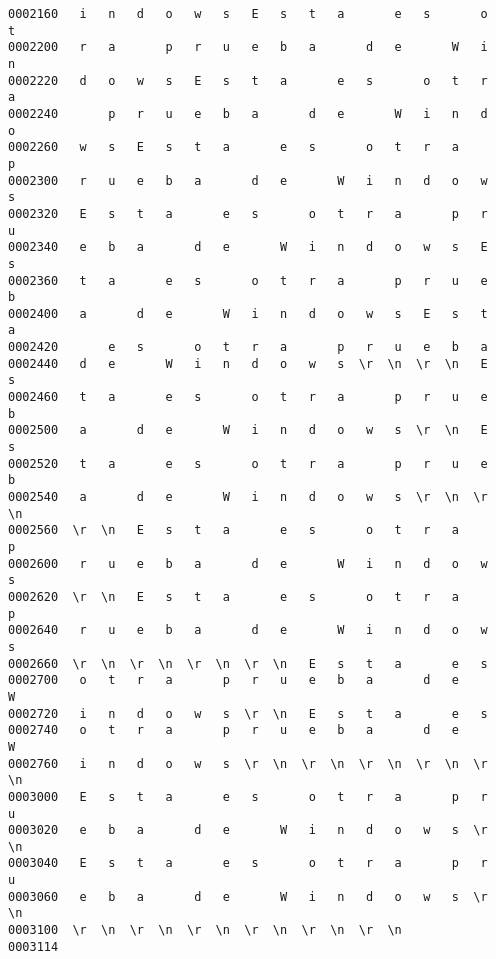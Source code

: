 \documentclass[a4paper,11pt]{article}
\begin{document}
\begin{itemize}
\begin{verbatim}
0002160   i   n   d   o   w   s   E   s   t   a       e   s       o   t
0002200   r   a       p   r   u   e   b   a       d   e       W   i   n
0002220   d   o   w   s   E   s   t   a       e   s       o   t   r   a
0002240       p   r   u   e   b   a       d   e       W   i   n   d   o
0002260   w   s   E   s   t   a       e   s       o   t   r   a       p
0002300   r   u   e   b   a       d   e       W   i   n   d   o   w   s
0002320   E   s   t   a       e   s       o   t   r   a       p   r   u
0002340   e   b   a       d   e       W   i   n   d   o   w   s   E   s
0002360   t   a       e   s       o   t   r   a       p   r   u   e   b
0002400   a       d   e       W   i   n   d   o   w   s   E   s   t   a
0002420       e   s       o   t   r   a       p   r   u   e   b   a    
0002440   d   e       W   i   n   d   o   w   s  \r  \n  \r  \n   E   s
0002460   t   a       e   s       o   t   r   a       p   r   u   e   b
0002500   a       d   e       W   i   n   d   o   w   s  \r  \n   E   s
0002520   t   a       e   s       o   t   r   a       p   r   u   e   b
0002540   a       d   e       W   i   n   d   o   w   s  \r  \n  \r  \n
0002560  \r  \n   E   s   t   a       e   s       o   t   r   a       p
0002600   r   u   e   b   a       d   e       W   i   n   d   o   w   s
0002620  \r  \n   E   s   t   a       e   s       o   t   r   a       p
0002640   r   u   e   b   a       d   e       W   i   n   d   o   w   s
0002660  \r  \n  \r  \n  \r  \n  \r  \n   E   s   t   a       e   s    
0002700   o   t   r   a       p   r   u   e   b   a       d   e       W
0002720   i   n   d   o   w   s  \r  \n   E   s   t   a       e   s    
0002740   o   t   r   a       p   r   u   e   b   a       d   e       W
0002760   i   n   d   o   w   s  \r  \n  \r  \n  \r  \n  \r  \n  \r  \n
0003000   E   s   t   a       e   s       o   t   r   a       p   r   u
0003020   e   b   a       d   e       W   i   n   d   o   w   s  \r  \n
0003040   E   s   t   a       e   s       o   t   r   a       p   r   u
0003060   e   b   a       d   e       W   i   n   d   o   w   s  \r  \n
0003100  \r  \n  \r  \n  \r  \n  \r  \n  \r  \n  \r  \n
0003114
\end{verbatim}


\end{itemize}
\end{document}
